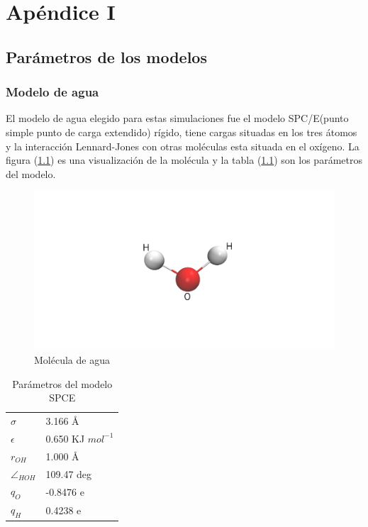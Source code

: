 \chapter{Apéndice I}

\section{Parámetros de los modelos}

\subsection{Modelo de agua}

El modelo de agua elegido para estas simulaciones fue el modelo SPC/E(punto simple punto de carga extendido) rígido, tiene cargas situadas en los tres átomos y la interacción Lennard-Jones con otras moléculas esta situada en el oxígeno. La figura (\ref{fig:SPCE}) es una visualización de la molécula y la tabla (\ref{SPCEpar}) son los parámetros del modelo.

\begin{figure}[!h]
    \centering
    \includegraphics[width=.9\textwidth,keepaspectratio=true]{SPCE.png}
    \caption{Molécula de agua}
    \label{fig:SPCE}
\end{figure}

\begin{table}[h!]
    \centering

    \begin{tabular}{ |p{1cm}|p{4cm}|  }
    \hline
    $\sigma$  & 3.166 \AA \\
    $\epsilon$& 0.650 KJ $mol^{-1}$ \\
    $r_{OH}$  & 1.000 \AA \\
    $\angle_{HOH}$&109.47 deg \\
    $q_{O}$   & -0.8476 e \\
    $q_{H}$   & 0.4238 e \\
    \hline
    \end{tabular}
    \caption{Parámetros del modelo SPCE}
    \label{SPCEpar}
\end{table}

